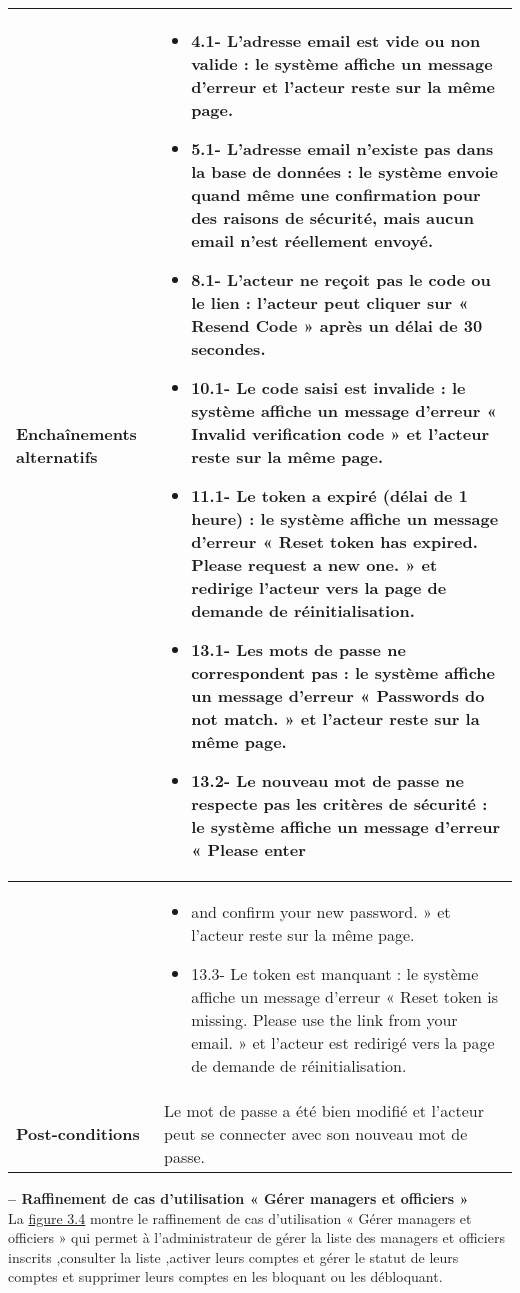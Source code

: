 \begin{longtable}{|>{\arraybackslash}p{4.2cm}|>{\arraybackslash}p{12.5cm}|}
\textbf{Enchaînements alternatifs} &
\begin{itemize}[label=]
  \item{4.1-} L'adresse email est vide ou non valide : le système affiche un message d'erreur et l'acteur reste sur la même page.
    \item{5.1-} L'adresse email n'existe pas dans la base de données : le système envoie quand même une confirmation pour des raisons de sécurité, mais aucun email n'est réellement envoyé.
    \item{8.1-} L'acteur ne reçoit pas le code ou le lien : l'acteur peut cliquer sur « Resend Code » après un délai de 30 secondes.
    \item{10.1-} Le code saisi est invalide : le système affiche un message d'erreur « Invalid verification code » et l'acteur reste sur la même page.
    \item{11.1-} Le token a expiré (délai de 1 heure) : le système affiche un message d'erreur « Reset token has expired. Please request a new one. »
    et redirige l'acteur vers la page de demande de réinitialisation.
    \item{13.1-} Les mots de passe ne correspondent pas : le système affiche un message d'erreur « Passwords do not match. » et l'acteur reste sur la même page.
      \item{13.2-} Le nouveau mot de passe ne respecte pas les critères de sécurité : le système affiche un message d'erreur « Please enter
 \end{itemize}


\\
\hline
\textbf{} &

\begin{itemize}[label=]
    \item  and confirm your new password. » et l'acteur reste sur la même page.
      \item{13.3-} Le token est manquant : le système affiche un message d'erreur « Reset token is missing. Please use the link from your email. » et l'acteur est redirigé vers la page de demande de réinitialisation.

\end{itemize} \\
\hline
\textbf{Post-conditions} & Le mot de passe a été bien modifié et l'acteur peut se connecter avec son nouveau mot de passe.

\end{longtable}
\textbf{ – Raffinement de cas d'utilisation « Gérer managers et officiers »}\\
La \hyperref[fig:3.4]{figure 3.4} montre le raffinement de cas d'utilisation « Gérer managers et officiers » qui permet à l'administrateur de gérer la liste des managers et officiers inscrits ,consulter la liste ,activer leurs comptes et gérer le statut de leurs comptes et supprimer leurs comptes en les bloquant ou les débloquant.


